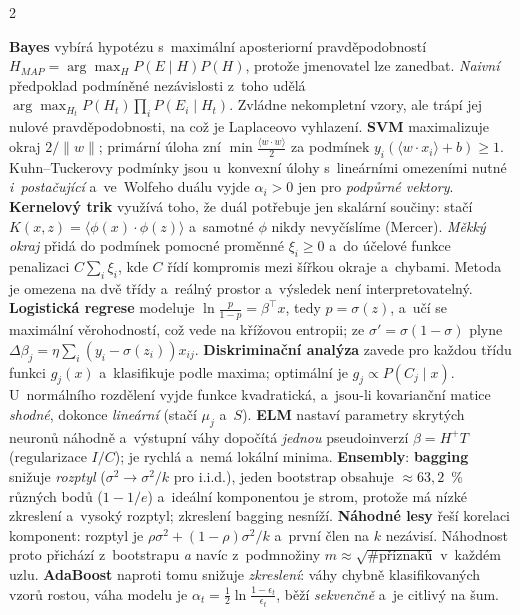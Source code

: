 \documentclass[10pt,a4paper]{article}
\newcommand{\hh}[1]{\par\smallskip\noindent{\bfseries\color{headcol}#1}\par\nobreak\vspace{-0.2em}}
\newcommand{\tm}[1]{\textbf{#1}}
\begin{document}
\begin{multicols}{2}
\hh{Další metody učení s~učitelem}
\tm{Bayes} vybírá hypotézu s~maximální aposteriorní pravděpodobností
$H_{MAP}=\arg\max_H P(E\mid H)P(H)$, protože jmenovatel lze zanedbat. \emph{Naivní}
předpoklad podmíněné nezávislosti z~toho udělá
$\arg\max_{H_t}P(H_t)\prod_i P(E_i\mid H_t)$.
Zvládne nekompletní vzory, ale trápí jej nulové pravděpodobnosti, na což je Laplaceovo
vyhlazení.
\tm{SVM} maximalizuje okraj $2/\|w\|$; primární úloha zní $\min \frac{\langle w\cdot
w\rangle}{2}$ za podmínek $y_i(\langle w\cdot x_i\rangle+b)\ge 1$. Kuhn--Tuckerovy podmínky
jsou u~konvexní úlohy s~lineárními omezeními nutné \emph{i~postačující} a~ve~Wolfeho duálu
vyjde $\alpha_i>0$ jen pro \emph{podpůrné vektory}. \tm{Kernelový trik} využívá toho, že duál
potřebuje jen skalární součiny: stačí $K(x,z)=\langle\phi(x)\cdot\phi(z)\rangle$ a~samotné
$\phi$ nikdy nevyčíslíme (Mercer). \emph{Měkký okraj} přidá do podmínek pomocné proměnné
$\xi_i\ge0$ a~do účelové funkce penalizaci $C\sum_i\xi_i$, kde $C$ řídí kompromis mezi šířkou
okraje a~chybami.
Metoda je omezena na dvě třídy a~reálný prostor a~výsledek není interpretovatelný.
\tm{Logistická regrese} modeluje $\ln\frac{p}{1-p}=\beta^{\!\top}x$, tedy $p=\sigma(z)$, a~učí
se maximální věrohodností, což vede na křížovou entropii; ze $\sigma'=\sigma(1-\sigma)$ plyne
$\Delta\beta_j=\eta\sum_i (y_i-\sigma(z_i))x_{ij}$.
\tm{Diskriminační analýza} zavede pro každou třídu funkci $g_j(x)$ a~klasifikuje podle maxima;
optimální je $g_j\propto P(C_j\mid x)$. U~normálního rozdělení vyjde funkce kvadratická,
a~jsou-li kovarianční matice \emph{shodné}, dokonce \emph{lineární} (stačí $\mu_j$ a~$S$).
\tm{ELM} nastaví parametry skrytých neuronů náhodně a~výstupní váhy dopočítá \emph{jednou}
pseudoinverzí $\beta=H^{+}T$ (regularizace $I/C$); je rychlá a~nemá lokální minima.
\tm{Ensembly}: \tm{bagging} snižuje \emph{rozptyl} ($\sigma^2\to\sigma^2/k$ pro i.i.d.),
jeden bootstrap obsahuje $\approx 63{,}2$~\% různých bodů ($1-1/e$) a~ideální komponentou je
strom, protože má nízké zkreslení a~vysoký rozptyl; zkreslení bagging nesníží.
\tm{Náhodné lesy} řeší korelaci komponent: rozptyl je $\rho\sigma^2+(1-\rho)\sigma^2/k$
a~první člen na $k$ nezávisí. Náhodnost proto přichází z~bootstrapu \emph{a} navíc
z~podmnožiny $m\approx\sqrt{\#\text{příznaků}}$ v~každém uzlu.
\tm{AdaBoost} naproti tomu snižuje \emph{zkreslení}: váhy chybně klasifikovaných vzorů rostou,
váha modelu je $\alpha_t=\frac12\ln\frac{1-\epsilon_t}{\epsilon_t}$, běží \emph{sekvenčně}
a~je citlivý na šum.


\end{multicols}
\end{document}
